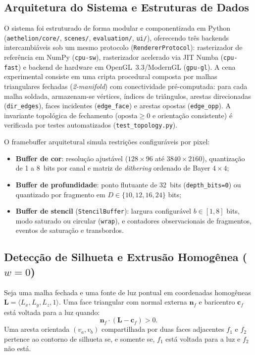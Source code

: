\documentclass[conference]{IEEEtran}
\begin{document}
\subsection{Arquitetura do Sistema e Estruturas de Dados}

O sistema foi estruturado de forma modular e componentizada em Python (\texttt{aethelion/core/}, \texttt{scenes/}, \texttt{evaluation/}, \texttt{ui/}), oferecendo três backends intercambiáveis sob um mesmo protocolo (\texttt{RendererProtocol}): rasterizador de referência em NumPy (\texttt{cpu-sw}), rasterizador acelerado via JIT Numba (\texttt{cpu-fast}) e backend de hardware em OpenGL~3.3/ModernGL (\texttt{gpu-gl}). A cena experimental consiste em uma cripta procedural composta por malhas triangulares fechadas (\textit{2-manifold}) com conectividade pré-computada: para cada malha soldada, armazenam-se vértices, índices de triângulos, arestas direcionadas (\texttt{dir\_edges}), faces incidentes (\texttt{edge\_face}) e arestas opostas (\texttt{edge\_opp}). A invariante topológica de fechamento ($\text{oposta} \ge 0$ e orientação consistente) é verificada por testes automatizados (\texttt{test\_topology.py}).

O framebuffer arquitetural simula restrições configuráveis por pixel:
\begin{itemize}
    \item \textbf{Buffer de cor}: resolução ajustável ($128\times 96$ até $3840\times 2160$), quantização de 1 a 8~bits por canal e matriz de \textit{dithering} ordenado de Bayer $4\times 4$;
    \item \textbf{Buffer de profundidade}: ponto flutuante de 32~bits (\texttt{depth\_bits=0}) ou quantizado por fragmento em $D \in \{10, 12, 16, 24\}$ bits;
    \item \textbf{Buffer de stencil} (\texttt{StencilBuffer}): largura configurável $b \in [1, 8]$ bits, modo saturado ou circular (\texttt{wrap}), e contadores observacionais de fragmentos, eventos de saturação e transbordos.
\end{itemize}

\subsection{Detecção de Silhueta e Extrusão Homogênea ($w=0$)}

Seja uma malha fechada e uma fonte de luz pontual em coordenadas homogêneas $\mathbf{L} = \langle L_x, L_y, L_z, 1 \rangle$. Uma face triangular com normal externa $\mathbf{n}_f$ e baricentro $\mathbf{c}_f$ está voltada para a luz quando:
\begin{equation}
\mathbf{n}_f \cdot (\mathbf{L} - \mathbf{c}_f) > 0.
\end{equation}
Uma aresta orientada $(v_a, v_b)$ compartilhada por duas faces adjacentes $f_1$ e $f_2$ pertence ao contorno de silhueta se, e somente se, $f_1$ está voltada para a luz e $f_2$ não está.
\end{document}

